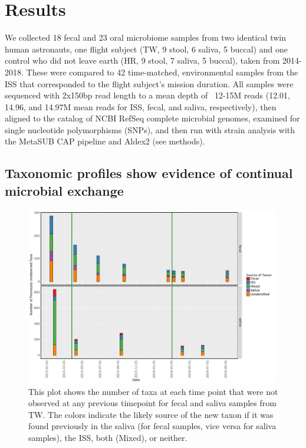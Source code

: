 
\section{Results}

We collected 18 fecal and 23 oral microbiome samples from two identical twin human astronauts, one flight subject (TW, 9 stool, 6 saliva, 5 buccal) and one control who did not leave earth (HR, 9 stool, 7 saliva, 5 buccal), taken from 2014-2018. These were compared to 42 time-matched, environmental samples from the ISS that corresponded to the flight subject's mission duration. All samples were sequenced with 2x150bp read length to a mean depth of ~12-15M reads (12.01, 14.96, and 14.97M mean reads for ISS, fecal, and saliva, respectively), then aligned to the catalog of NCBI RefSeq complete microbial genomes, examined for single nucleotide polymorphisms (SNPs), and then run with strain analysis with the MetaSUB CAP pipeline and Aldex2 (see methods). 

\subsection{Taxonomic profiles show evidence of continual microbial exchange}

\begin{figure}
  \begin{center}
    \includegraphics[width=0.99\textwidth]{figs/twins_taxa_sources.png}
	\caption{\small{
	    This plot shows the number of taxa at each time point that were not observed at any previous timepoint for fecal and saliva samples from TW. The colors indicate the likely source of the new taxon if it was found previously in the saliva (for fecal samples, vice versa for saliva samples), the ISS, both (Mixed), or neither.
	}}
    \label{fig:taxasource}
  \end{center}
\end{figure}

